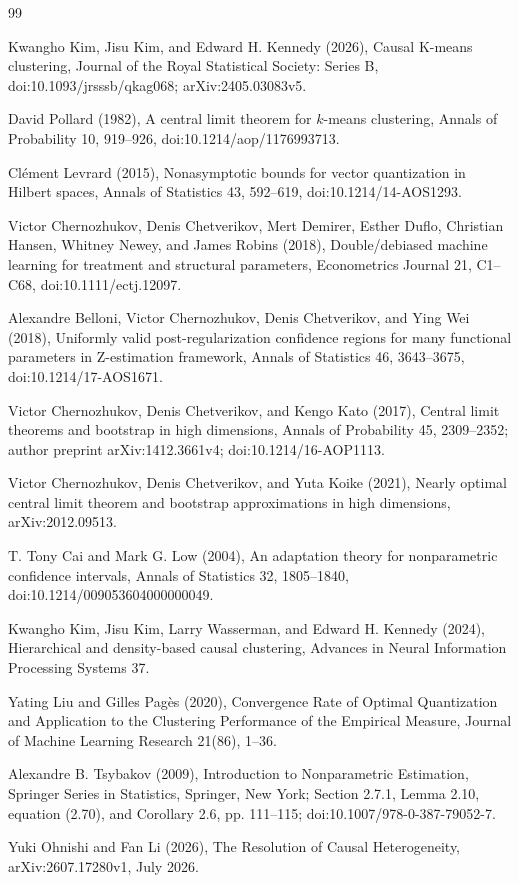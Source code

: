 \documentclass{article}
\begin{document}
\begin{thebibliography}{99}

   Kwangho Kim, Jisu Kim, and Edward H. Kennedy (2026), Causal K-means clustering, Journal of the Royal Statistical Society: Series B, doi:10.1093/jrsssb/qkag068; arXiv:2405.03083v5.

   David Pollard (1982), A central limit theorem for \(k\)-means clustering, Annals of Probability 10, 919--926, doi:10.1214/aop/1176993713.

   Clément Levrard (2015), Nonasymptotic bounds for vector quantization in Hilbert spaces, Annals of Statistics 43, 592--619, doi:10.1214/14-AOS1293.

   Victor Chernozhukov, Denis Chetverikov, Mert Demirer, Esther Duflo, Christian Hansen, Whitney Newey, and James Robins (2018), Double/debiased machine learning for treatment and structural parameters, Econometrics Journal 21, C1--C68, doi:10.1111/ectj.12097.

   Alexandre Belloni, Victor Chernozhukov, Denis Chetverikov, and Ying Wei (2018), Uniformly valid post-regularization confidence regions for many functional parameters in Z-estimation framework, Annals of Statistics 46, 3643--3675, doi:10.1214/17-AOS1671.

   Victor Chernozhukov, Denis Chetverikov, and Kengo Kato (2017), Central limit theorems and bootstrap in high dimensions, Annals of Probability 45, 2309--2352; author preprint arXiv:1412.3661v4; doi:10.1214/16-AOP1113.

   Victor Chernozhukov, Denis Chetverikov, and Yuta Koike (2021), Nearly optimal central limit theorem and bootstrap approximations in high dimensions, arXiv:2012.09513.

   T. Tony Cai and Mark G. Low (2004), An adaptation theory for nonparametric confidence intervals, Annals of Statistics 32, 1805--1840, doi:10.1214/009053604000000049.

   Kwangho Kim, Jisu Kim, Larry Wasserman, and Edward H. Kennedy (2024), Hierarchical and density-based causal clustering, Advances in Neural Information Processing Systems 37.

   Yating Liu and Gilles Pagès (2020), Convergence Rate of Optimal Quantization and Application to the Clustering Performance of the Empirical Measure, Journal of Machine Learning Research 21(86), 1–36.

   Alexandre B. Tsybakov (2009), Introduction to Nonparametric Estimation, Springer Series in Statistics, Springer, New York; Section 2.7.1, Lemma 2.10, equation (2.70), and Corollary 2.6, pp. 111--115; doi:10.1007/978-0-387-79052-7.

   Yuki Ohnishi and Fan Li (2026), The Resolution of Causal Heterogeneity, arXiv:2607.17280v1, July 2026.

\end{thebibliography}
\end{document}
